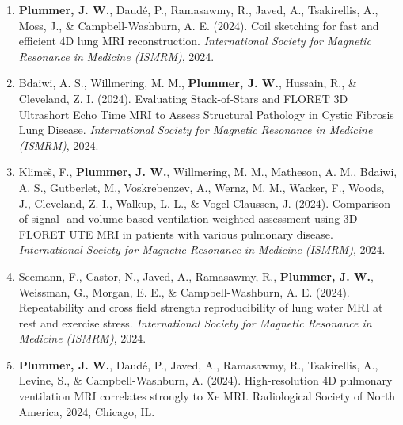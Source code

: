 \documentclass[12pt,]{scrartcl}
\begin{document}
\begin{enumerate}
  \leftskip-0.13in %



  \item \textbf{Plummer, J. W.}, Daudé, P., Ramasawmy, R., Javed, A., Tsakirellis, A., Moss, J., \& Campbell-Washburn, A. E. (2024). Coil sketching for fast and efficient 4D lung MRI reconstruction. \textit{International Society for Magnetic Resonance in Medicine (ISMRM)}, 2024.



    \item Bdaiwi, A. S., Willmering, M. M., \textbf{Plummer, J. W.}, Hussain, R., \& Cleveland, Z. I. (2024). Evaluating Stack-of-Stars and FLORET 3D Ultrashort Echo Time MRI to Assess Structural Pathology in Cystic Fibrosis Lung Disease. \textit{International Society for Magnetic Resonance in Medicine (ISMRM)}, 2024.
    
    \item Klimeš, F., \textbf{Plummer, J. W.}, Willmering, M. M., Matheson, A. M., Bdaiwi, A. S., Gutberlet, M., Voskrebenzev, A., Wernz, M. M., Wacker, F., Woods, J., Cleveland, Z. I., Walkup, L. L., \& Vogel-Claussen, J. (2024). Comparison of signal- and volume-based ventilation-weighted assessment using 3D FLORET UTE MRI in patients with various pulmonary disease. \textit{International Society for Magnetic Resonance in Medicine (ISMRM)}, 2024.
    
    \item Seemann, F., Castor, N., Javed, A., Ramasawmy, R., \textbf{Plummer, J. W.}, Weissman, G., Morgan, E. E., \& Campbell-Washburn, A. E. (2024). Repeatability and cross field strength reproducibility of lung water MRI at rest and exercise stress. \textit{International Society for Magnetic Resonance in Medicine (ISMRM)}, 2024.
    
    
  \item \textbf{Plummer, J. W.}, Daudé, P., Javed, A., Ramasawmy, R., Tsakirellis, A., Levine, S., \& Campbell-Washburn, A. (2024). High-resolution 4D pulmonary ventilation MRI correlates strongly to Xe MRI. Radiological Society of North America, 2024, Chicago, IL.


\end{enumerate}
\end{document}
